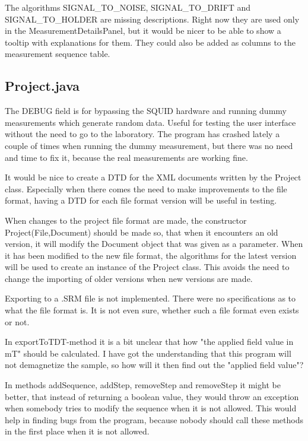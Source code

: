The algorithms SIGNAL_TO_NOISE, SIGNAL_TO_DRIFT and SIGNAL_TO_HOLDER are missing descriptions. Right now they are used only in the MeasurementDetailsPanel, but it would be nicer to be able to show a tooltip with explanations for them. They could also be added as columns to the measurement sequence table.


\subsection{Project.java}

The DEBUG field is for bypassing the SQUID hardware and running dummy measurements which generate random data. Useful for testing the user interface without the need to go to the laboratory. The program has crashed lately a couple of times when running the dummy measurement, but there was no need and time to fix it, because the real measurements are working fine.

It would be nice to create a DTD for the XML documents written by the Project class. Especially when there comes the need to make improvements to the file format, having a DTD for each file format version will be useful in testing.

When changes to the project file format are made, the constructor Project(File,Document) should be made so, that when it encounters an old version, it will modify the Document object that was given as a parameter. When it has been modified to the new file format, the algorithms for the latest version will be used to create an instance of the Project class. This avoids the need to change the importing of older versions when new versions are made.

Exporting to a .SRM file is not implemented. There were no specifications as to what the file format is. It is not even sure, whether such a file format even exists or not.

In exportToTDT-method it is a bit unclear that how "the applied field value in mT" should be calculated. I have got the understanding that this program will not demagnetize the sample, so how will it then find out the "applied field value"?

In methods addSequence, addStep, removeStep and removeStep it might be better, that instead of returning a boolean value, they would throw an exception when somebody tries to modify the sequence when it is not allowed. This would help in finding bugs from the program, because nobody should call these methods in the first place when it is not allowed.

